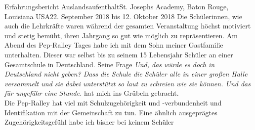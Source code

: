 \documentclass[oneside,openany,headings=optiontotoc,11pt,numbers=noenddot]{article}
\begin{document}
\begin{worksheet}{Erfahrungsbericht Auslandsaufenthalt}{St. Joseph\grq{}s Academy, Baton Rouge, Louisiana USA}{22. September 2018 bis 12. Oktober 2018}
		Die Schülerinnen, wie auch die Lehrkräfte waren während der gesamten Veranstaltung höchst motiviert und stetig bemüht, ihren Jahrgang so gut wie möglich zu repräsentieren.
		\small{Am Abend des Pep-Ralley Tages habe ich mit dem Sohn meiner Gastfamilie unterhalten. Dieser war selbst bis zu seinem 15 Lebensjahr Schüler an einer Gesamtschule in Deutschland. Seine Frage \glqq{}\textit{Und, das würde es doch in Deutschland nicht geben? Dass die Schule die Schüler alle in einer großen Halle versammelt und sie dabei unterstützt so laut zu schreien wie sie können. Und das für ungefähr eine Stunde.}\grqq{} hat mich ins Grübeln gebracht.\\
		Die Pep-Ralley hat viel mit Schulzugehörigkeit und -verbundenheit und Identifikation mit der Gemeinschaft zu tun. Eine ähnlich ausgeprägtes Zugehörigkeitsgefühl habe ich bisher bei keinem Schüler }

\end{worksheet}
\end{document}
